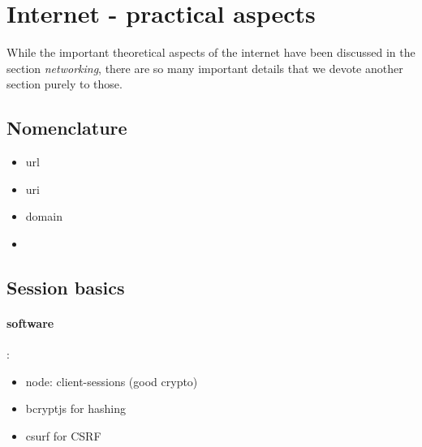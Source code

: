 \section{Internet - practical aspects}

While the important theoretical aspects of the internet have been discussed in the section \emph{networking}, there are so many important details that we devote another section purely to those. 

\subsection{Nomenclature}

\begin{itemize}
	\item url
	\item uri
	\item domain
	\item 
\end{itemize}




\subsection{Session basics}

\paragraph{software}:
\begin{itemize}
     \item node: client-sessions (good crypto)
     \item bcryptjs for hashing
     \item csurf for CSRF
\end{itemize}


